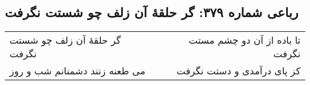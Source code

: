 \begin{center}
\section*{رباعی شماره ۳۷۹: گر حلقهٔ آن زلف چو شستت نگرفت}
\label{sec:0379}
\begin{longtable}{l p{0.5cm} r}
گر حلقهٔ آن زلف چو شستت نگرفت
&&
تا باده از آن دو چشم مستت نگرفت
\\
می طعنه زنند دشمنانم شب و روز
&&
کز پای درآمدی و دستت نگرفت
\\
\end{longtable}
\end{center}

